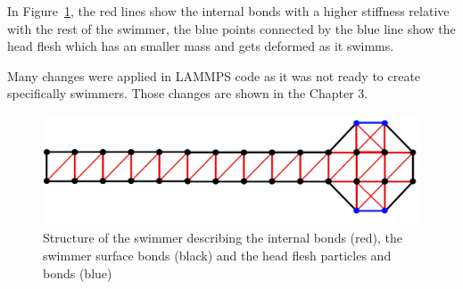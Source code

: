 In Figure~\ref{fig:Bild5}, the red lines show the internal bonds with a higher stiffness relative with the rest of the swimmer, the blue points connected by the blue line show the 
head flesh which has an smaller mass and gets deformed as it swimms.\par
Many changes were applied in LAMMPS code as it was not ready to create specifically swimmers. Those changes are shown in the Chapter 3.


\begin{figure}
\centering
  \begin{footnotesize}
  \includegraphics[scale=0.25]{images/swimmer-compare.png}
  \caption[Structure of the swimmer describing the internal bonds (red), the swimmer surface bonds (black) and the head flesh particles and bonds(blue)]{Structure of the swimmer describing the internal bonds (red), the swimmer surface bonds (black) and the head flesh particles and bonds (blue)}
  \label{fig:Bild5}
  \end{footnotesize}
\end{figure} 




